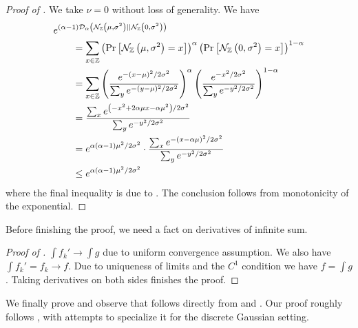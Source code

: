\documentclass{article}
\begin{document}
\begin{proof}[Proof of ]
	We take $\nu=0$ without loss of generality.
	We have
	\begin{align}
		&e^{(\alpha-1)\mathcal{D}_\alpha\left(\mathcal{N}_{\mathbb{Z}}\left(\mu, \sigma^2\right) || \mathcal{N}_{\mathbb{Z}}\left(0, \sigma^2\right)\right)}\\
		&\qquad=\sum_{x\in\mathbb{Z}}\left(\Pr\left[\mathcal{N}_{\mathbb{Z}}\left(\mu, \sigma^2\right)=x\right]\right)^\alpha\left(\Pr\left[\mathcal{N}_{\mathbb{Z}}\left(0, \sigma^2\right)=x\right]\right)^{1-\alpha}\\
		&\qquad=\sum_{x\in\mathbb{Z}}
			\left(
				\frac{e^{-(x-\mu)^2/2\sigma^2}}{\sum_y e^{-(y-\mu)^2/2\sigma^2}}
			\right)^\alpha
			\left(
				\frac{e^{-x^2/2\sigma^2}}{\sum_y e^{-y^2/2\sigma^2}}
			\right)^{1-\alpha}\\
		&\qquad=\frac{\sum_x e^{\left(-x^2+2\alpha\mu x-\alpha\mu^2\right)/2\sigma^2}}{\sum_y e^{-y^2/2\sigma^2}}\\
		&\qquad=e^{\alpha(\alpha-1)\mu^2/2\sigma^2}\cdot\frac{\sum_x e^{-\left(x-\alpha\mu\right)^2/2\sigma^2}}{\sum_y e^{-y^2/2\sigma^2}}\\
		&\qquad\leq e^{\alpha(\alpha-1)\mu^2/2\sigma^2}
	\end{align}
	where the final inequality is due to .
	The conclusion follows from monotonicity of the exponential.
\end{proof}

Before finishing the proof, we need a fact on derivatives of infinite sum.
\begin{proof}[Proof of ]
	$\int f_k'\rightarrow \int g$ due to uniform convergence assumption.
	We also have $\int f_k'=f_k\rightarrow f$.
	Due to uniqueness of limits and the $C^1$ condition we have $f=\int g$.
	Taking derivatives on both sides finishes the proof.
\end{proof}

We finally prove  and observe that  follows directly from  and .
Our proof roughly follows \cite{renyi-kl}, with attempts to specialize it for the discrete Gaussian setting.
\end{document}
